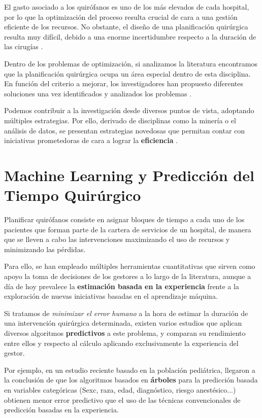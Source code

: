 El gasto asociado a los quirófanos es uno de los más elevados de cada hospital, por lo que la optimización del proceso resulta crucial de cara a una gestión eficiente de los recursos.
No obstante, el diseño de una planificación quirúrgica resulta muy difícil, debido a una enorme incertidumbre respecto a la duración de las cirugías \cite{Celik2023APrinciple}.

Dentro de los problemas de optimización, si analizamos la literatura encontramos que la planificación quirúrgica ocupa un área especial dentro de esta disciplina.
En función del criterio a mejorar, los investigadores han propuesto diferentes soluciones una vez identificados y analizados los problemas \cite{Gur2018ApplicationOverview}.

Podemos contribuir a la investigación desde diversos puntos de vista, adoptando múltiples estrategias.
Por ello, derivado de disciplinas como la minería o el análisis de datos, se presentan estrategias novedosas que permitan contar con iniciativas prometedoras de cara a lograr la \textbf{eficiencia }\cite{Schouten2023OperatingReview}.
\newpage

\section{Machine Learning y Predicción del Tiempo Quirúrgico}
Planificar quirófanos consiste en asignar bloques de tiempo a cada uno de los pacientes que forman parte de la cartera de servicios de un hospital, de manera que se lleven a cabo las intervenciones maximizando el uso de recursos y minimizando las pérdidas.

Para ello, se han empleado múltiples herramientas cuantitativas que sirven como apoyo la toma de decisiones de los gestores a lo largo de la literatura, aunque a día de hoy prevalece la \textbf{estimación basada en la experiencia} \cite{Brailsford2011ORPerspective} frente a la exploración de nuevas iniciativas basadas en el aprendizaje máquina. 

Si tratamos de \textit{minimizar el error humano} a la hora de estimar la duración de una intervención quirúrgica determinada, existen varios estudios que aplican diversos algoritmos \textbf{predictivos} a este problema, y comparan su rendimiento entre ellos y respecto al cálculo aplicando exclusivamente la experiencia del gestor.

Por ejemplo, en un estudio reciente \cite{Master2017ImprovingLearning} basado en la población pediátrica, llegaron a la conclusión de que los algoritmos basados en \textbf{árboles} para la predicción basada en variables categóricas (Sexc, raza, edad, diagnóstico, riesgo anestésico...) obtienen menor error predictivo que el uso de las técnicas convencionales de predicción basadas en la experiencia.

